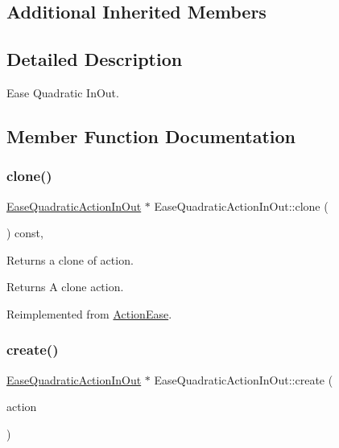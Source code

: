 \subsection*{Additional Inherited Members}


\subsection{Detailed Description}
Ease Quadratic In\+Out. 

\subsection{Member Function Documentation}
\mbox{\label{classEaseQuadraticActionInOut_a0cb4186dee46962ef6e801288c199a53}} 
\subsubsection{\texorpdfstring{clone()}{clone()}}
{\footnotesize\ttfamily \hyperlink{classEaseQuadraticActionInOut}{Ease\+Quadratic\+Action\+In\+Out} $\ast$ Ease\+Quadratic\+Action\+In\+Out\+::clone (\begin{DoxyParamCaption}\item[{void}]{ }\end{DoxyParamCaption}) const\hspace{0.3cm}{\ttfamily [override]}, {\ttfamily [virtual]}}

Returns a clone of action.

\begin{DoxyReturn}{Returns}
A clone action. 
\end{DoxyReturn}


Reimplemented from \hyperlink{classActionEase_a39bec93fe161fb732a74d8e51a2fe08b}{Action\+Ease}.

\mbox{\label{classEaseQuadraticActionInOut_a96b043286d05fb22b64fa6a4620b73ef}} 
\subsubsection{\texorpdfstring{create()}{create()}}
{\footnotesize\ttfamily \hyperlink{classEaseQuadraticActionInOut}{Ease\+Quadratic\+Action\+In\+Out} $\ast$ Ease\+Quadratic\+Action\+In\+Out\+::create (\begin{DoxyParamCaption}\item[{\hyperlink{classActionInterval}{Action\+Interval} $\ast$}]{action }\end{DoxyParamCaption})\hspace{0.3cm}{\ttfamily [static]}}



